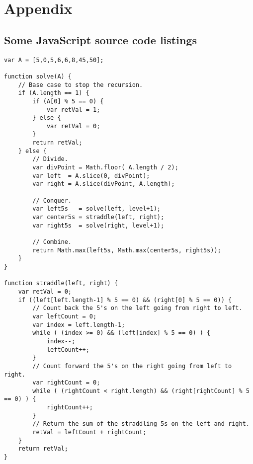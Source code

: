 \documentclass[letterpaper, 10pt,DIV=13]{scrartcl}
\numberwithin{equation}{section} %
\numberwithin{figure}{section} %
\numberwithin{table}{section} %
\begin{document}
\pagebreak


\section{Appendix}

\subsection{Some JavaScript source code listings}

\lstset{numbers=left, numberstyle=\tiny, stepnumber=1, numbersep=5pt, basicstyle=\footnotesize\ttfamily}
\begin{lstlisting}[frame=single, ]  
var A = [5,0,5,6,6,8,45,50];

function solve(A) {
    // Base case to stop the recursion.
    if (A.length == 1) {
        if (A[0] % 5 == 0) {
            var retVal = 1;
        } else {
            var retVal = 0;
        }
        return retVal;
    } else {
        // Divide.
        var divPoint = Math.floor( A.length / 2);
        var left  = A.slice(0, divPoint);
        var right = A.slice(divPoint, A.length);
        
        // Conquer.
        var left5s   = solve(left, level+1);
        var center5s = straddle(left, right);
        var right5s  = solve(right, level+1);             
        
        // Combine.
        return Math.max(left5s, Math.max(center5s, right5s));
    }
}

function straddle(left, right) {
    var retVal = 0;
    if ((left[left.length-1] % 5 == 0) && (right[0] % 5 == 0)) {
        // Count back the 5's on the left going from right to left.
        var leftCount = 0;
        var index = left.length-1;
        while ( (index >= 0) && (left[index] % 5 == 0) ) {
            index--;
            leftCount++;
        }
        // Count forward the 5's on the right going from left to right.
        var rightCount = 0;
        while ( (rightCount < right.length) && (right[rightCount] % 5 == 0) ) {
            rightCount++;
        }
        // Return the sum of the straddling 5s on the left and right.
        retVal = leftCount + rightCount;
    }
    return retVal;
}
\end{lstlisting}
\end{document}
